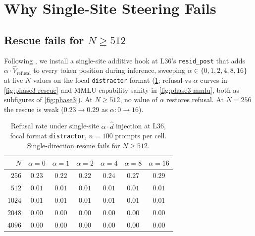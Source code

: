 \documentclass[10pt,twocolumn]{article}
\newcommand{\dhat}{\hat{d}}
\newcommand{\Ncontext}{N}
\theoremstyle{definition}
\begin{document}
\section{Why Single-Site Steering Fails}
\label{sec:rescue}

\subsection{Rescue fails for $\Ncontext{\geq}512$}

Following \citet{turner2023activation}, we install a single-site
additive hook at L36's \texttt{resid\_post} that adds
$\alpha\!\cdot\!\hat{V}_{\mathrm{refusal}}$ to every token position
during inference, sweeping $\alpha \in \{0,1,2,4,8,16\}$ at five
$\Ncontext$ values on the focal \texttt{distractor} format
(\cref{tab:rescue}; refusal-vs-$\alpha$ curves in \cref{fig:phase3-rescue} and MMLU capability sanity in \cref{fig:phase3-mmlu}, both as subfigures of \cref{fig:phase3}). At $\Ncontext{\geq}512$, no value of $\alpha$
restores refusal. At $\Ncontext{=}256$ the rescue is weak
($0.23 \to 0.29$ as $\alpha: 0 \to 16$).

\begin{table}[t]
\centering\small
\begin{tabular}{rcccccc}
\toprule
$\Ncontext$ & $\alpha{=}0$ & $\alpha{=}1$ & $\alpha{=}2$ & $\alpha{=}4$ & $\alpha{=}8$ & $\alpha{=}16$ \\
\midrule
$256$  & $0.23$ & $0.22$ & $0.22$ & $0.24$ & $0.27$ & $0.29$ \\
$512$  & $0.01$ & $0.01$ & $0.01$ & $0.01$ & $0.01$ & $0.01$ \\
$1024$ & $0.01$ & $0.01$ & $0.01$ & $0.01$ & $0.01$ & $0.01$ \\
$2048$ & $0.00$ & $0.00$ & $0.00$ & $0.00$ & $0.00$ & $0.00$ \\
$4096$ & $0.00$ & $0.00$ & $0.00$ & $0.00$ & $0.00$ & $0.00$ \\
\bottomrule
\end{tabular}
\caption{Refusal rate under single-site $\alpha\!\cdot\!\dhat$
injection at L36, focal format \texttt{distractor}, $n{=}100$
prompts per cell. Single-direction rescue fails for $\Ncontext{\geq}512$.}
\label{tab:rescue}
\end{table}
\end{document}
